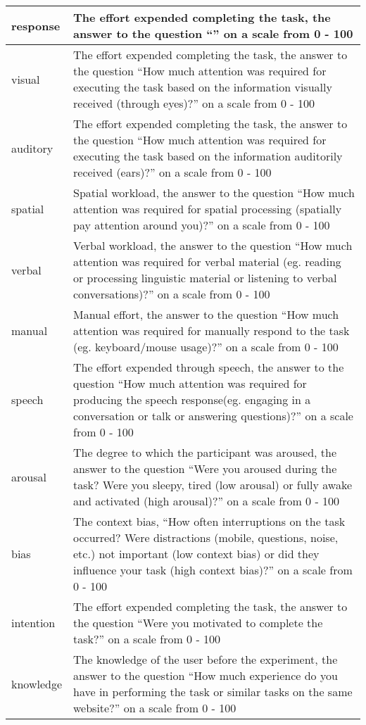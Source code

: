 \begin{table}[]
\begin{tabular}{|l|p{8cm}|}
 response & The effort expended completing the task, the answer to the question ``'' on a scale from 0 - 100 \\ \hline
 visual & The effort expended completing the task, the answer to the question ``How much attention was required for executing the task based on the information visually received (through eyes)?'' on a scale from 0 - 100 \\ \hline
 auditory & The effort expended completing the task, the answer to the question ``How much attention was required for executing the task based on the information auditorily received (ears)?'' on a scale from 0 - 100 \\ \hline
 spatial & Spatial workload, the answer to the question ``How much attention was required for spatial processing (spatially pay attention around you)?'' on a scale from 0 - 100 \\ \hline
 verbal & Verbal workload, the answer to the question ``How much attention was required for verbal material (eg. reading or processing linguistic material or listening to verbal conversations)?'' on a scale from 0 - 100 \\ \hline
 manual & Manual effort, the answer to the question ``How much attention was required for manually respond to the task (eg. keyboard/mouse usage)?'' on a scale from 0 - 100 \\ \hline
 speech & The effort expended through speech, the answer to the question ``How much attention was required for producing the speech response(eg. engaging in a conversation or talk or answering questions)?'' on a scale from 0 - 100 \\ \hline
 arousal & The degree to which the participant was aroused, the answer to the question ``Were you aroused during the task? Were you sleepy, tired (low arousal) or fully awake and activated (high arousal)?'' on a scale from 0 - 100 \\ \hline
 bias & The context bias, ``How often interruptions on the task occurred? Were distractions (mobile, questions, noise, etc.) not important (low context bias) or did they influence your task (high context bias)?'' on a scale from 0 - 100 \\ \hline
 intention &  The effort expended completing the task, the answer to the question ``Were you motivated to complete the task?'' on a scale from 0 - 100 \\ \hline
 knowledge & The knowledge of the user before the experiment, the answer to the question ``How much experience do you have in performing the task or similar tasks on the same website?'' on a scale from 0 - 100 \\ \hline

\end{tabular}
\end{table}
